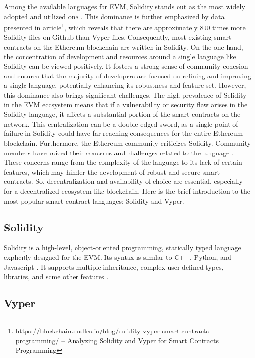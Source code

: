 Among the available languages for EVM, Solidity stands out as the most widely adopted and utilized one \cite{SolidityWidelyUsed, SolidityDevsChallenges}. This dominance is further emphasized by data presented in article\footnote{\href{https://blockchain.oodles.io/blog/solidity-vyper-smart-contracts-programming/}{https://blockchain.oodles.io/blog/solidity-vyper-smart-contracts-programming/} -- Analyzing Solidity and Vyper for Smart Contracts Programming}, which reveals that there are approximately 800 times more Solidity files on Github than Vyper files. Consequently, most existing smart contracts on the Ethereum blockchain are written in Solidity. On the one hand, the concentration of development and resources around a single language like Solidity can be viewed positively. It fosters a strong sense of community cohesion and ensures that the majority of developers are focused on refining and improving a single language, potentially enhancing its robustness and feature set. However, this dominance also brings significant challenges. The high prevalence of Solidity in the EVM ecosystem means that if a vulnerability or security flaw arises in the Solidity language, it affects a substantial portion of the smart contracts on the network. This centralization can be a double-edged sword, as a single point of failure in Solidity could have far-reaching consequences for the entire Ethereum blockchain. Furthermore, the Ethereum community criticizes Solidity. Community members have voiced their concerns and challenges related to the language \cite{SolidityDevsChallenges}. These concerns range from the complexity of the language to its lack of certain features, which may hinder the development of robust and secure smart contracts. So, decentralization and availability of choice are essential, especially for a decentralized ecosystem like blockchain. Here is the brief introduction to the most popular smart contract languages: Solidity and Vyper.

\subsection{Solidity}

Solidity is a high-level, object-oriented programming, statically typed language explicitly designed for the EVM. Its syntax is similar to C++, Python, and Javascript \cite{SolidityInspirasion}. It supports multiple inheritance, complex user-defined types, libraries, and some other features \cite{SolidityFeatures}.

\subsection{Vyper}

